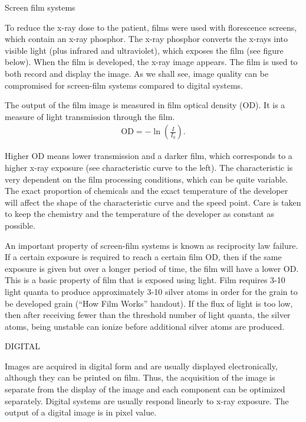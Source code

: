 \documentclass[mphy386-notes.tex]{subfiles}
\begin{document}
Screen film systems

To reduce the x-ray dose to the patient, films were used with florescence
screens, which contain an x-ray phosphor. The x-ray phosphor converts the
x-rays into visible light (plus infrared and ultraviolet), which exposes the
film (see figure below). When the film is developed, the x-ray image appears.
The film is used to both record and display the image. As we shall see, image
quality can be compromised for screen-film systems compared to digital systems.


The output of the film image is measured in film optical density (OD).  It is a
measure of light transmission through the film.
\begin{align}
  \text{OD} = -\ln\left(\frac{I}{I_0}\right).
\end{align}

Higher OD means lower transmission and a darker film, which corresponds to a
higher x-ray exposure (see characteristic curve to the left). The characteristic
is very dependent on the film processing conditions, which can be quite
variable. The exact proportion of chemicals and the exact temperature of the
developer will affect the shape of the characteristic curve and the speed point.
Care is taken to keep the chemistry and the temperature of the developer as
constant as possible.


An important property of screen-film systems is known as reciprocity law
failure.  If a certain exposure is required to reach a certain film OD, then if
the same exposure is given but over a longer period of time, the film will have
a lower OD.  This is a basic property of film that is exposed using light.  Film
requires 3-10 light quanta to produce approximately 3-10 silver atoms in order
for the grain to be developed grain (“How Film Works” handout).  If the flux of
light is too low, then after receiving fewer than the threshold number of light
quanta, the silver atoms, being unstable can ionize before additional silver
atoms are produced.

DIGITAL

Images are acquired in digital form and are usually displayed electronically,
although they can be printed on film. Thus, the acquisition of the image is
separate from the display of the image and each component can be optimized
separately. Digital systems are usually respond linearly to x-ray exposure.
The output of a digital image is in pixel value.
\end{document}
